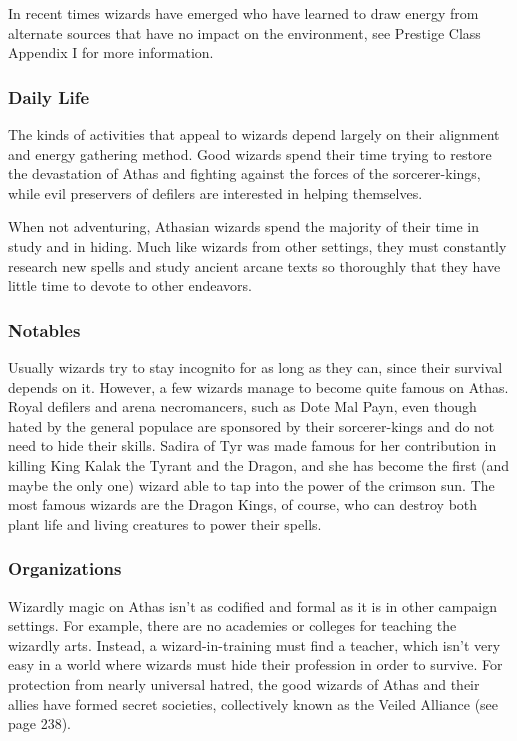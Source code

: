 In recent times wizards have emerged who have learned to draw energy from alternate sources that have no impact on the environment, see Prestige Class Appendix I for more information.

\subsubsection{Daily Life}
The kinds of activities that appeal to wizards depend largely on their alignment and energy gathering method. Good wizards spend their time trying to restore the devastation of Athas and fighting against the forces of the sorcerer-kings, while evil preservers of defilers are interested in helping themselves.

When not adventuring, Athasian wizards spend the majority of their time in study and in hiding. Much like wizards from other settings, they must constantly research new spells and study ancient arcane texts so thoroughly that they have little time to devote to other endeavors.

\subsubsection{Notables}
Usually wizards try to stay incognito for as long as they can, since their survival depends on it. However, a few wizards manage to become quite famous on Athas. Royal defilers and arena necromancers, such as Dote Mal Payn, even though hated by the general populace are sponsored by their sorcerer-kings and do not need to hide their skills. Sadira of Tyr was made famous for her contribution in killing King Kalak the Tyrant and the Dragon, and she has become the first (and maybe the only one) wizard able to tap into the power of the crimson sun. The most famous wizards are the Dragon Kings, of course, who can destroy both plant life and living creatures to power their spells.

\subsubsection{Organizations}
Wizardly magic on Athas isn't as codified and formal as it is in other campaign settings. For example, there are no academies or colleges for teaching the wizardly arts. Instead, a wizard-in-training must find a teacher, which isn't very easy in a world where wizards must hide their profession in order to survive. For protection from nearly universal hatred, the good wizards of Athas and their allies have formed secret societies, collectively known as the Veiled Alliance (see page 238).

